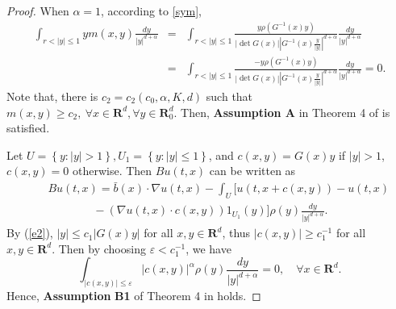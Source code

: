 \documentclass[11pt]{amsart}
\theoremstyle{plain}
\numberwithin{equation}{section}
\begin{document}
\begin{proof}
When $\alpha =1$, according to \eqref{sym}, 
\begin{eqnarray*}
\int_{r<\left\vert y\right\vert \leq 1}ym\left( x,y\right) \frac{dy}{\left\vert y\right\vert ^{d+\alpha }} &=&\int_{r<\left\vert y\right\vert
\leq 1}\frac{y\rho \left( G^{-1}\left( x\right) y\right) }{\left\vert \det
G\left( x\right) \right\vert \left\vert G^{-1}\left( x\right) \frac{y}{\left\vert y\right\vert }\right\vert ^{d+\alpha }}\frac{dy}{\left\vert
y\right\vert ^{d+\alpha }} \\
&=&\int_{r<\left\vert y\right\vert \leq 1}\frac{-y\rho \left( G^{-1}\left(
x\right) y\right) }{\left\vert \det G\left( x\right) \right\vert \left\vert
G^{-1}\left( x\right) \frac{y}{\left\vert y\right\vert }\right\vert
^{d+\alpha }}\frac{dy}{\left\vert y\right\vert ^{d+\alpha }}=0.
\end{eqnarray*}Note that, there is $c_{2}=c_{2}\left( c_{0},\alpha,K,d\right) $ such that $m\left( x,y\right) \geq c_{2},~\forall x\in \mathbf{R}^{d},\forall y\in 
\mathbf{R}_{0}^{d}$. Then, \textbf{Assumption A} in Theorem 4 of \cite{mp1}
is satisfied.

Let $U=\left\{ y:\left\vert y\right\vert >1\right\} ,U_{1}=\left\{
y:\left\vert y\right\vert \leq 1\right\} $, and $c\left( x,y\right) =G\left(
x\right) y$ if $\left\vert y\right\vert >1$, $c\left( x,y\right) =0$
otherwise. Then $Bu\left( t,x\right) $ can be written as 
\begin{eqnarray*}
&&Bu\left( t,x\right) =\bar{b}\left( x\right) \cdot \nabla u\left(
t,x\right) -\int_{U}[u\left( t,x+c\left( x,y\right) \right) -u\left(
t,x\right) \\
&&\qquad \qquad -\left( \nabla u\left( t,x\right) \cdot c\left( x,y\right)
\right) 1_{U_{1}}\left( y\right) ]\rho \left( y\right) \frac{dy}{|y|^{d+\alpha }}.
\end{eqnarray*}By (\ref{e2}), $\left\vert y\right\vert \leq c_{1}\left\vert G\left(
x\right) y\right\vert $ for all $x,y\in \mathbf{R}^{d}$, thus $\left\vert
c\left( x,y\right) \right\vert \geq c_{1}^{-1}$ for all $x,y\in \mathbf{R}^{d}$. Then by choosing $\varepsilon <c_{1}^{-1}$, we have 
\begin{equation*}
\int_{\left\vert c\left( x,y\right) \right\vert \leq \varepsilon }\left\vert
c\left( x,y\right) \right\vert ^{\alpha }\rho \left( y\right) \frac{dy}{\left\vert y\right\vert ^{d+\alpha }}=0,\quad \forall x\in \mathbf{R}^{d}.
\end{equation*}Hence, \textbf{Assumption} \textbf{B1 }of Theorem 4 in \cite{mp1} holds.


\end{proof}
\end{document}
